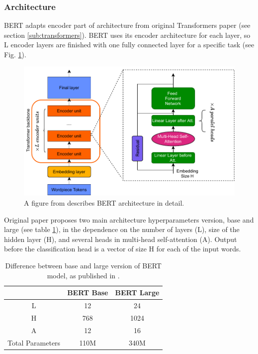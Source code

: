 \subsubsection{Architecture}
BERT adapts encoder part of architecture from original Transformers paper   \citep{Vaswani2017} (see section \ref{sub:transformers}).
BERT uses its encoder architecture for each layer, so L encoder layers are finished with one fully connected layer for a specific task (see Fig. \ref{pic:bert_arch}).

\begin{figure}[ht]
\centering
\includegraphics[width=0.8\columnwidth]{../img/bert_arch}
\caption{A figure from \citep{Ganesh2020} describes BERT architecture in detail.}
\label{pic:bert_arch}
\end{figure}

 Original paper proposes two main architecture hyperparameters version, base and large (see table \ref{Tab:base_large}), in the dependence on the number of layers (L), size of the hidden layer (H), and several heads in multi-head self-attention (A). Output before the classification head is a vector of size H for each of the input words. 

\begin{table}
\centering
\begin{tabular}{ |c|c|c| } 
 \hline
    & BERT Base &BERT Large \\ 
 \hline \hline
 L & 12 & 24 \\ \hline
 H & 768 & 1024 \\ \hline
  A & 12 & 16\\ \hline
Total Parameters & 110M & 340M \\\hline
\end{tabular}
\caption{Difference between base and large version of BERT model, as published in 
\citep{Devlin2019}.
} 
\label{Tab:base_large}
\end{table}

